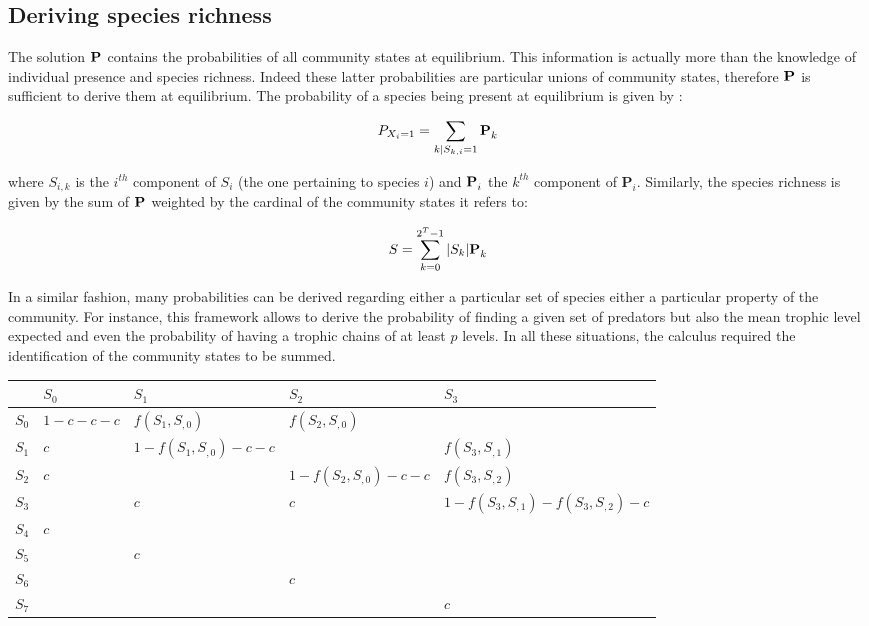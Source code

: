 \subsection{Deriving species richness}\label{deriving-species-richness}

The solution \(\mathbf{P}^{\*}\) contains the probabilities of all
community states at equilibrium. This information is actually more than
the knowledge of individual presence and species richness. Indeed these
latter probabilities are particular unions of community states,
therefore \(\mathbf{P}^{\*}\) is sufficient to derive them at
equilibrium. The probability of a species being present at equilibrium
is given by :

\begin{equation}
P_{X_i=1} = \sum_{k \mid S_{k,i}=1} \mathbf{P}_{k}^{\*}
\end{equation}

where \(S_{i,k}\) is the \(i^{th}\) component of \(S_i\) (the one
pertaining to species \(i\)) and \(\mathbf{P}_{i}^{\*}\) the \(k^{th}\)
component of \(\mathbf{P}_{i}\). Similarly, the species richness is
given by the sum of \(\mathbf{P}^{\*}\) weighted by the cardinal of the
community states it refers to:

\begin{equation}
S= \sum_{k=0}^{2^T-1} |S_k|\mathbf{P}_{k}^{\*}
\end{equation}

In a similar fashion, many probabilities can be derived regarding either
a particular set of species either a particular property of the
community. For instance, this framework allows to derive the probability
of finding a given set of predators but also the mean trophic level
expected and even the probability of having a trophic chains of at least
\(p\) levels. In all these situations, the calculus required the
identification of the community states to be summed.

\newpage

\begin{longtable}[]{@{}lllll@{}}
\toprule
& \(S_{0}\) & \(S_{1}\) & \(S_{2}\) & \(S_{3}\)\tabularnewline
\midrule
\endhead
\(S_{0}\) & \(1-c-c-c\) & \(f(S_{1},S_{,0})\) & \(f(S_{2},S_{,0})\)
&\tabularnewline
\(S_{1}\) & \(c\) & \(1-f(S_{1},S_{,0})-c-c\) & &
\(f(S_{3},S_{,1})\)\tabularnewline
\(S_{2}\) & \(c\) & & \(1-f(S_{2},S_{,0})-c-c\) &
\(f(S_{3},S_{,2})\)\tabularnewline
\(S_{3}\) & & \(c\) & \(c\) &
\(1-f(S_{3},S_{,1})-f(S_{3},S_{,2})-c\)\tabularnewline
\(S_{4}\) & \(c\) & & &\tabularnewline
\(S_{5}\) & & \(c\) & &\tabularnewline
\(S_{6}\) & & & \(c\) &\tabularnewline
\(S_{7}\) & & & & \(c\)\tabularnewline
\bottomrule
\end{longtable}

